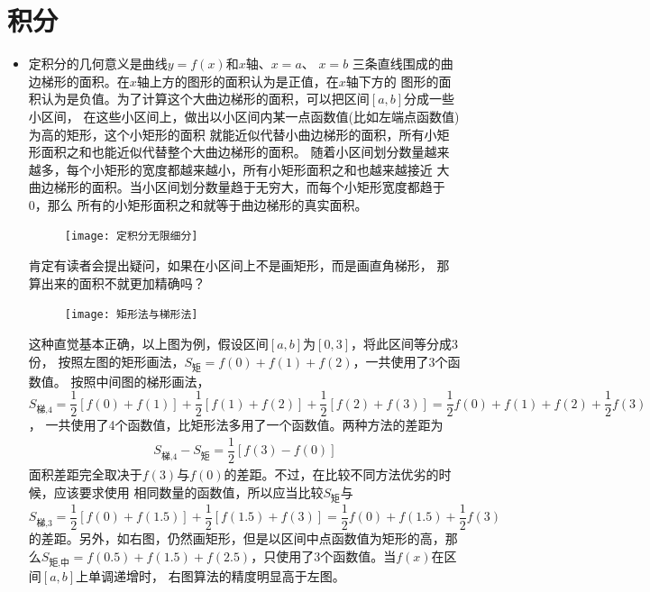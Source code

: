 \section{积分}
\begin{itemize}[leftmargin=\inteval{\myitemleftmargin}pt,itemsep=
   \inteval{\myitemitempsep}pt,topsep=\inteval{\myitemtopsep}pt]

\item 定积分的几何意义是曲线$ y=f(x) $和$ x $轴、$ x=a $、 $ x=b $
三条直线围成的曲边梯形的面积。在$ x $轴上方的图形的面积认为是正值，在$ x $轴下方的
图形的面积认为是负值。为了计算这个大曲边梯形的面积，可以把区间$ [a,b] $分成一些小区间，
在这些小区间上，做出以小区间内某一点函数值(比如左端点函数值)为高的矩形，这个小矩形的面积
就能近似代替小曲边梯形的面积，所有小矩形面积之和也能近似代替整个大曲边梯形的面积。
随着小区间划分数量越来越多，每个小矩形的宽度都越来越小，所有小矩形面积之和也越来越接近
大曲边梯形的面积。当小区间划分数量趋于无穷大，而每个小矩形宽度都趋于0，那么
所有的小矩形面积之和就等于曲边梯形的真实面积。
\begin{figure}[h]
    \centering
    \texttt{[image: 定积分无限细分]}
\end{figure}

肯定有读者会提出疑问，如果在小区间上不是画矩形，而是画直角梯形，
那算出来的面积不就更加精确吗？
\begin{figure}[h]
    \centering
    \texttt{[image: 矩形法与梯形法]}
\end{figure}

这种直觉基本正确，以上图为例，假设区间$ [a,b] $为$ [0,3] $，将此区间等分成3份，
按照左图的矩形画法，$ S_{\text{矩}}=f(0)+f(1)+f(2) $，一共使用了3个函数值。
按照中间图的梯形画法，$ S_{\text{梯,4}}= \dfrac{1}{2}[f(0)+f(1)]+\dfrac{1}{2}
[f(1)+f(2)]+\dfrac{1}{2}[f(2)+f(3)]=\dfrac{1}{2}f(0)+f(1)+f(2)+\dfrac{1}{2}f(3) $，
一共使用了4个函数值，比矩形法多用了一个函数值。两种方法的差距为
\begin{gather*}
    S_{\text{梯,4}}-S_{\text{矩}}=\dfrac{1}{2}[f(3)-f(0)]
\end{gather*}
面积差距完全取决于$ f(3) $与$ f(0) $的差距。不过，在比较不同方法优劣的时候，应该要求使用
相同数量的函数值，所以应当比较$ S_{\text{矩}} $与$ S_{\text{梯,3}}=\dfrac{1}{2}
[f(0)+f(1.5)]+\dfrac{1}{2}[f(1.5)+f(3)]=\dfrac{1}{2}f(0)+f(1.5)+\dfrac{1}{2}f(3) $ 
的差距。另外，如右图，仍然画矩形，但是以区间中点函数值为矩形的高，那么$ S_{\text{矩,中}}
=f(0.5)+f(1.5)+f(2.5) $，只使用了3个函数值。当$ f(x) $在区间$ [a,b] $上单调递增时，
右图算法的精度明显高于左图。


\end{itemize}
